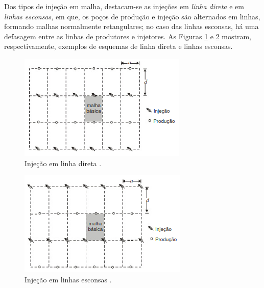 Dos tipos de inje\c{c}\~{a}o em malha, destacam-se as inje\c{c}\~{o}es em \textit{linha direta} e em \textit{linhas esconsas}, em que, os po\c{c}os de produ\c{c}\~{a}o e inje\c{c}\~{a}o s\~{a}o alternados em linhas, formando malhas normalmente retangulares; no caso das linhas esconsas, h\'{a} uma defasagem entre as linhas de produtores e injetores. As Figuras \ref{fig:rev_injld} e \ref{fig:rev_injle} mostram, respectivamente, exemplos de esquemas de linha direta e linhas esconsas.

\begin{figure}[!ht]
\centering
\includegraphics[width=.6\textwidth]{figs/revisao/revisao_injld.png}
\caption{Inje\c{c}\~{a}o em linha direta \cite[p. 567]{engres}.}
\label{fig:rev_injld}
\end{figure}

\begin{figure}[!ht]
\centering
\includegraphics[width=.6\textwidth]{figs/revisao/revisao_injle.png}
\caption{Inje\c{c}\~{a}o em linhas esconsas \cite[p. 567]{engres}.}
\label{fig:rev_injle}
\end{figure}


